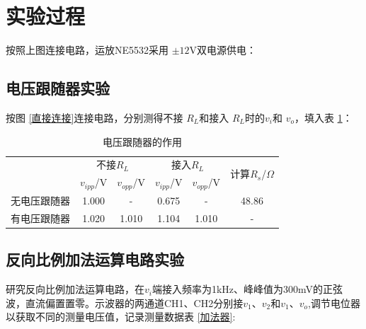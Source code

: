 \documentclass[a4paper]{article}
\theoremstyle{definition}
\theoremstyle{plain}
\theoremstyle{remark}
\newcommand{\reffig}[1]{图 \ref{#1}}
\newcommand{\reftab}[1]{表 \ref{#1}}
\begin{document}
\section{实验过程}
按照上图连接电路，运放NE5532采用 $\pm \mathrm{12V}$双电源供电：

\subsection{电压跟随器实验}
按\reffig{直接连接}连接电路，分别测得不接 $R_L$和接入 $R_L$时的$v_i$和 $v_o$，填入\reftab{电压跟随器的作用}：

\begin{table}[H]
	\center
	\large
	\begin{tabular}{|c|cc|cc|c|}
		\hline
		\multirow{2}{*}{} & \multicolumn{2}{c|}{不接$R_L$}     & \multicolumn{2}{c|}{接入$R_L$} & \multirow{2}{*}{计算$R_s$/$\Omega$}                       \\ \cline{2-5}
		                  & \multicolumn{1}{c|}{$v_{ipp}$/V} & $v_{opp}$/V                  & \multicolumn{1}{c|}{$v_{ipp}$/V}  & $v_{opp}$/V &       \\ \hline
		无电压跟随器            & \multicolumn{1}{c|}{1.000}       & -                            & \multicolumn{1}{c|}{0.675}        & -           & 48.86 \\ \hline
		有电压跟随器            & \multicolumn{1}{c|}{1.020}       & 1.010                        & \multicolumn{1}{c|}{1.104}        & 1.010       & -     \\ \hline
	\end{tabular}
	\caption{电压跟随器的作用}
	\label{电压跟随器的作用}
\end{table}

\subsection{反向比例加法运算电路实验}
研究反向比例加法运算电路，在$v_i$端接入频率为1kHz、峰峰值为300mV的正弦波，直流偏置置零。示波器的两通道CH1、CH2分别接$v_1$、$v_2$和$v_1$、$v_o$,调节电位器以获取不同的测量电压值，记录测量数据\reftab{加法器}:
\end{document}
